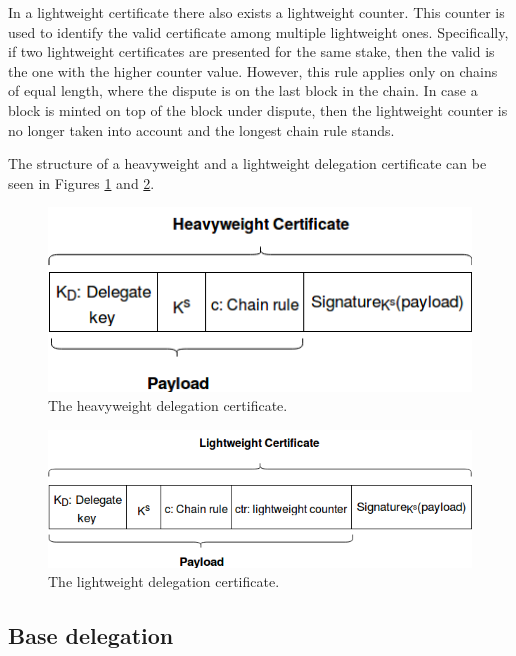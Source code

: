 In a lightweight certificate there also exists a lightweight counter. This counter is used to identify the valid certificate among multiple lightweight ones. Specifically, if two lightweight certificates are presented for the same stake, then the valid is the one with the higher counter value. However, this rule applies only on chains of equal length, where the dispute is on the last block in the chain. In case a block is minted on top of the block under dispute, then the lightweight counter is no longer taken into account and the longest chain rule stands.

The structure of a heavyweight and a lightweight delegation certificate can be seen in Figures \ref{fig:certificate_v2} and \ref{fig:light_certificate_v2}.

\begin{figure}
  \begin{center}
    \includegraphics[width=340pt]{certificate_v2.png}
  \end{center}
  \caption{The heavyweight delegation certificate.}
  \label{fig:certificate_v2}
\end{figure}

\begin{figure}
  \begin{center}
    \includegraphics[width=340pt]{light_certificate_v2.png}
  \end{center}
  \caption{The lightweight delegation certificate.}
  \label{fig:light_certificate_v2}
\end{figure}

\subsection{Base delegation}

